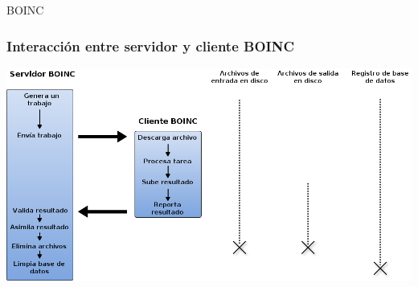 \begin{subsection}{BOINC}
	\begin{frame}\frametitle{Interacción entre servidor y cliente BOINC}
		\begin{center}
			\includegraphics[scale=0.32]{images/Client-Server-Interact.png}
		\end{center}
	\end{frame}
	
\end{subsection}
